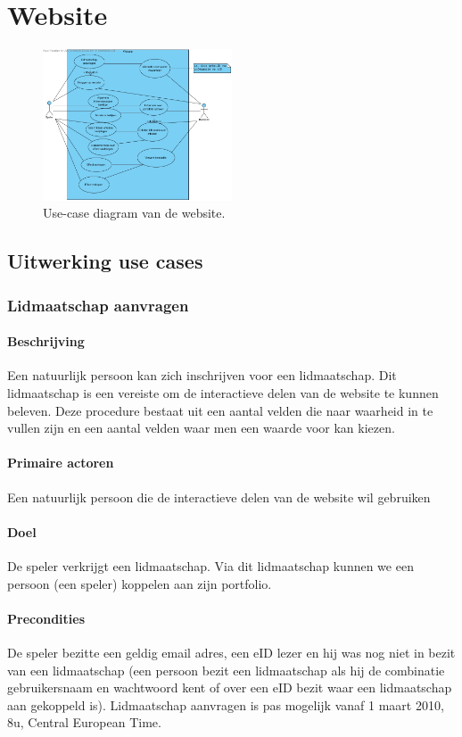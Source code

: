 \section{Website}

\begin{figure}[h!]
	\centering
		\includegraphics[width=0.5\textwidth]{images/analyse/ucd_website}
	\caption{Use-case diagram van de website.}
\end{figure}

\subsection{Uitwerking use cases}

\subsubsection{Lidmaatschap aanvragen}
\paragraph{Beschrijving}Een natuurlijk persoon kan zich inschrijven voor een lidmaatschap. Dit lidmaatschap is een vereiste om de interactieve delen van de website te kunnen beleven. Deze procedure bestaat uit een aantal velden die naar waarheid in te vullen zijn en een aantal velden waar men een waarde voor kan kiezen.
\paragraph{Primaire actoren}Een natuurlijk persoon die de interactieve delen van de website wil gebruiken
\paragraph{Doel}De speler verkrijgt een lidmaatschap. Via dit lidmaatschap kunnen we een persoon (een speler) koppelen aan zijn portfolio.
\paragraph{Precondities}De speler bezitte een geldig email adres, een eID lezer en hij was nog niet in bezit van een lidmaatschap (een persoon bezit een lidmaatschap als hij de combinatie gebruikersnaam en wachtwoord kent of over een eID bezit waar een lidmaatschap aan gekoppeld is). \small{Lidmaatschap aanvragen is pas mogelijk vanaf 1 maart 2010, 8u, Central European Time.}
